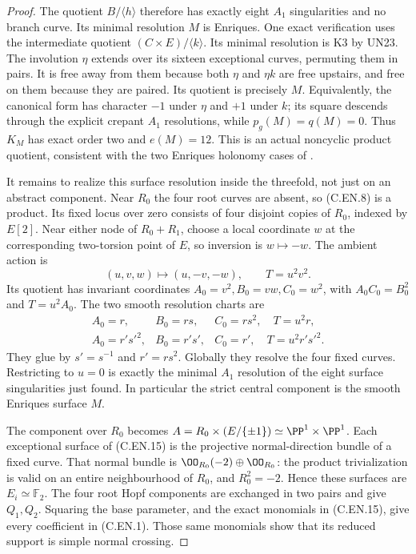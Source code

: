 \begin{proof}
The quotient $B/\langle h\rangle$ therefore
has exactly eight $A_1$ singularities and
no branch curve. Its minimal resolution
$M$ is Enriques. One exact verification
uses the intermediate quotient
$(C\times E)/\langle k\rangle$. Its
minimal resolution is K3 by UN23.
The involution $\eta$ extends over its
sixteen exceptional curves, permuting
them in pairs. It is free away from
them because both $\eta$ and $\eta k$
are free upstairs, and free on them
because they are paired. Its quotient
is precisely $M$. Equivalently, the
canonical form has character $-1$
under $\eta$ and $+1$ under $k$;
its square descends through the
explicit crepant $A_1$ resolutions,
while $p_g(M)=q(M)=0$. Thus $K_M$
has exact order two and $e(M)=12$.
This is an actual noncyclic product
quotient, consistent with the two
Enriques holonomy cases of
\cite[Theorem~2.1 and Example~2.3]{Yoshihara1995}.

It remains to realize this surface resolution
inside the threefold, not just on an abstract
component. Near $R_0$ the four root curves
are absent, so (C.EN.8) is a product.
Its fixed locus over zero consists of four
disjoint copies of $R_0$, indexed by $E[2]$.
Near either node of $R_0+R_1$, choose a
local coordinate $w$ at the corresponding
two-torsion point of $E$, so inversion is
$w\mapsto-w$. The ambient action is
\[
 (u,v,w)\longmapsto(u,-v,-w),\qquad
                         T=u^2v^2 .
                                                               \tag{C.EN.14}
\]
Its quotient has invariant coordinates
$A_0=v^2,B_0=vw,C_0=w^2$, with
$A_0C_0=B_0^2$ and $T=u^2A_0$.
The two smooth resolution charts are
\[
 \begin{array}{lll}
 A_0=r,&B_0=rs,&C_0=rs^2,\quad T=u^2r,\\
 A_0=r's'^2,&B_0=r's',&C_0=r',\quad T=u^2r's'^2 .
 \end{array}                                             \tag{C.EN.15}
\]
They glue by $s'=s^{-1}$ and $r'=rs^2$.
Globally they resolve the four fixed
curves. Restricting to $u=0$ is exactly
the minimal $A_1$ resolution of the
eight surface singularities just found.
In particular the strict central component
is the smooth Enriques surface $M$.

The component over $R_0$ becomes
$A=R_0\times(E/\{\pm1\})\simeq\PP^1\times\PP^1$.
Each exceptional surface of (C.EN.15)
is the projective normal-direction bundle
of a fixed curve. That normal bundle is
$\OO_{R_0}(-2)\oplus\OO_{R_0}$: the
product trivialization is valid on an
entire neighbourhood of $R_0$, and
$R_0^2=-2$. Hence these surfaces are
$E_i\simeq\mathbb F_2$.
The four root Hopf components are
exchanged in two pairs and give
$Q_1,Q_2$. Squaring the base parameter,
and the exact monomials in (C.EN.15),
give every coefficient in (C.EN.1).
Those same monomials show that its
reduced support is simple normal
crossing.


\end{proof}
